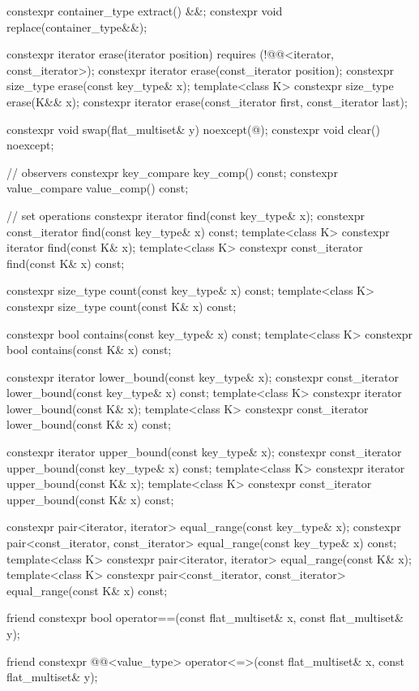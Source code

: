 \begin{codeblock}
{{    constexpr container_type extract() &&;
    constexpr void replace(container_type&&);

    constexpr iterator erase(iterator position) requires (!@@<iterator, const_iterator>);
    constexpr iterator erase(const_iterator position);
    constexpr size_type erase(const key_type& x);
    template<class K> constexpr size_type erase(K&& x);
    constexpr iterator erase(const_iterator first, const_iterator last);

    constexpr void swap(flat_multiset& y) noexcept(@\seebelow@);
    constexpr void clear() noexcept;

    // observers
    constexpr key_compare key_comp() const;
    constexpr value_compare value_comp() const;

    // set operations
    constexpr iterator find(const key_type& x);
    constexpr const_iterator find(const key_type& x) const;
    template<class K> constexpr iterator find(const K& x);
    template<class K> constexpr const_iterator find(const K& x) const;

    constexpr size_type count(const key_type& x) const;
    template<class K> constexpr size_type count(const K& x) const;

    constexpr bool contains(const key_type& x) const;
    template<class K> constexpr bool contains(const K& x) const;

    constexpr iterator lower_bound(const key_type& x);
    constexpr const_iterator lower_bound(const key_type& x) const;
    template<class K> constexpr iterator lower_bound(const K& x);
    template<class K> constexpr const_iterator lower_bound(const K& x) const;

    constexpr iterator upper_bound(const key_type& x);
    constexpr const_iterator upper_bound(const key_type& x) const;
    template<class K> constexpr iterator upper_bound(const K& x);
    template<class K> constexpr const_iterator upper_bound(const K& x) const;

    constexpr pair<iterator, iterator> equal_range(const key_type& x);
    constexpr pair<const_iterator, const_iterator> equal_range(const key_type& x) const;
    template<class K>
      constexpr pair<iterator, iterator> equal_range(const K& x);
    template<class K>
      constexpr pair<const_iterator, const_iterator> equal_range(const K& x) const;

    friend constexpr bool operator==(const flat_multiset& x, const flat_multiset& y);

    friend constexpr @@<value_type>
      operator<=>(const flat_multiset& x, const flat_multiset& y);

}}
\end{codeblock}
